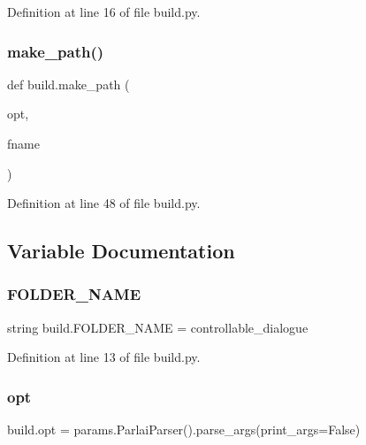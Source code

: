 Definition at line 16 of file build.\+py.

\mbox{\label{namespacebuild_a1b0dea9407e08660826abf8294ea4136}} 
\subsubsection{\texorpdfstring{make\+\_\+path()}{make\_path()}}
{\footnotesize\ttfamily def build.\+make\+\_\+path (\begin{DoxyParamCaption}\item[{}]{opt,  }\item[{}]{fname }\end{DoxyParamCaption})}



Definition at line 48 of file build.\+py.



\subsection{Variable Documentation}
\mbox{\label{namespacebuild_ad7a8528768257a8dae5e4115d7653a4a}} 
\subsubsection{\texorpdfstring{F\+O\+L\+D\+E\+R\+\_\+\+N\+A\+ME}{FOLDER\_NAME}}
{\footnotesize\ttfamily string build.\+F\+O\+L\+D\+E\+R\+\_\+\+N\+A\+ME = \textquotesingle{}controllable\+\_\+dialogue\textquotesingle{}}



Definition at line 13 of file build.\+py.

\mbox{\label{namespacebuild_acdefcc58695b0ac3dac914e85bb8e8fc}} 
\subsubsection{\texorpdfstring{opt}{opt}}
{\footnotesize\ttfamily build.\+opt = params.\+Parlai\+Parser().parse\+\_\+args(print\+\_\+args=False)}



